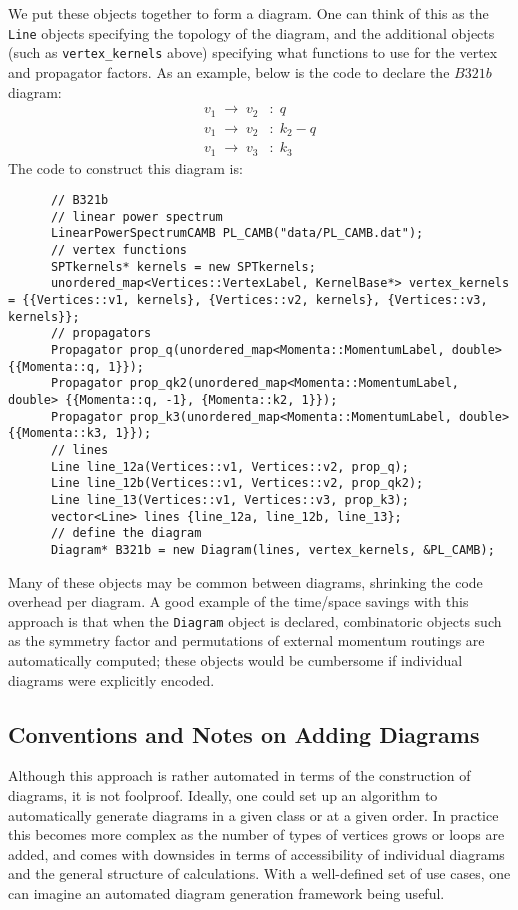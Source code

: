 \documentclass[12pt]{article}
\newcommand{\nn}{\nonumber}
\begin{document}
We put these objects together to form a diagram.  One can think of this as the \texttt{Line} objects specifying the topology of the diagram, and the additional objects (such as \texttt{vertex\_kernels} above) specifying what functions to use for the vertex and propagator factors.  As an example, below is the code to declare the $B321b$ diagram:
\begin{align}
v_1 \; \to \; v_2 &:\; q \nn \\
v_1 \; \to \; v_2 &:\; k_2 - q \nn \\
v_1 \; \to \; v_3 &:\; k_3 \nn
\end{align}
The code to construct this diagram is:
\begin{lstlisting}
      // B321b
      // linear power spectrum
      LinearPowerSpectrumCAMB PL_CAMB("data/PL_CAMB.dat");
      // vertex functions
      SPTkernels* kernels = new SPTkernels;
      unordered_map<Vertices::VertexLabel, KernelBase*> vertex_kernels = {{Vertices::v1, kernels}, {Vertices::v2, kernels}, {Vertices::v3, kernels}};
      // propagators
      Propagator prop_q(unordered_map<Momenta::MomentumLabel, double> {{Momenta::q, 1}});
      Propagator prop_qk2(unordered_map<Momenta::MomentumLabel, double> {{Momenta::q, -1}, {Momenta::k2, 1}});
      Propagator prop_k3(unordered_map<Momenta::MomentumLabel, double> {{Momenta::k3, 1}});
      // lines
      Line line_12a(Vertices::v1, Vertices::v2, prop_q);
      Line line_12b(Vertices::v1, Vertices::v2, prop_qk2);
      Line line_13(Vertices::v1, Vertices::v3, prop_k3);
      vector<Line> lines {line_12a, line_12b, line_13};
      // define the diagram
      Diagram* B321b = new Diagram(lines, vertex_kernels, &PL_CAMB);
\end{lstlisting}
Many of these objects may be common between diagrams, shrinking the code overhead per diagram.  A good example of the time/space savings with this approach is that when the \texttt{Diagram} object is declared, combinatoric objects such as the symmetry factor and permutations of external momentum routings are automatically computed; these objects would be cumbersome if individual diagrams were explicitly encoded.

\subsection{Conventions and Notes on Adding Diagrams}

Although this approach is rather automated in terms of the construction of diagrams, it is not foolproof.  Ideally, one could set up an algorithm to automatically generate diagrams in a given class or at a given order.  In practice this becomes more complex as the number of types of vertices grows or loops are added, and comes with downsides in terms of accessibility of individual diagrams and the general structure of calculations.  With a well-defined set of use cases, one can imagine an automated diagram generation framework being useful.
\end{document}

